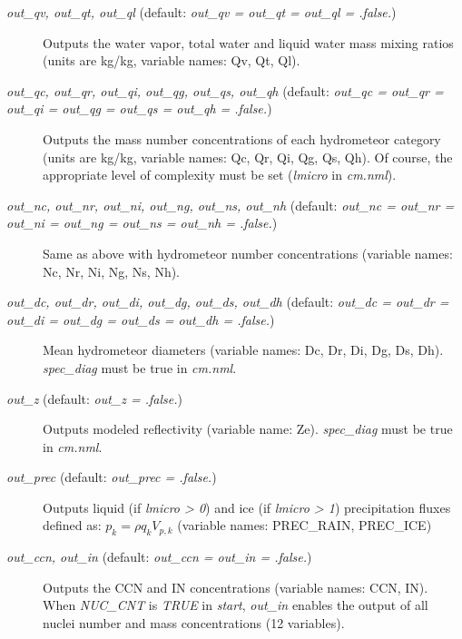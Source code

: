 \documentclass[12pt,A4,french]{article}
\begin{document}
\begin{description}
\item[{\it out\_qv, out\_qt, out\_ql} (default: {\it out\_qv = out\_qt = out\_ql = .false.})]

Outputs the water vapor, total water and liquid water mass mixing ratios (units are kg/kg, variable names: Qv, Qt, Ql).

\item[{\it out\_qc, out\_qr, out\_qi, out\_qg, out\_qs, out\_qh} (default: {\it out\_qc = out\_qr = out\_qi = out\_qg = out\_qs = out\_qh = .false.})]

Outputs the mass number concentrations of each hydrometeor category (units are kg/kg, variable names: Qc, Qr, Qi, Qg, Qs, Qh). Of course, the appropriate level of complexity must be set ({\it lmicro} in {\it cm.nml}).

\item[{\it out\_nc, out\_nr, out\_ni, out\_ng, out\_ns, out\_nh} (default: {\it out\_nc = out\_nr = out\_ni = out\_ng = out\_ns = out\_nh = .false.})]

Same as above with hydrometeor number concentrations (variable names: Nc, Nr, Ni, Ng, Ns, Nh).

\item[{\it out\_dc, out\_dr, out\_di, out\_dg, out\_ds, out\_dh} (default: {\it out\_dc = out\_dr = out\_di = out\_dg = out\_ds = out\_dh = .false.})]

Mean hydrometeor diameters (variable names: Dc, Dr, Di, Dg, Ds, Dh). {\it spec\_diag} must be true in {\it cm.nml}.

\item[{\it out\_z} (default: {\it out\_z = .false.})]

Outputs modeled reflectivity (variable name: Ze). {\it spec\_diag} must be true in {\it cm.nml}.

\item[{\it out\_prec} (default: {\it out\_prec = .false.})]

Outputs liquid (if {\it lmicro > 0}) and ice (if {\it lmicro > 1}) precipitation fluxes defined as: $p_k = \rho q_k V_{p,k}$ (variable names: PREC\_RAIN, PREC\_ICE)

\item[{\it out\_ccn, out\_in} (default: {\it out\_ccn = out\_in = .false.})]

Outputs the CCN and IN concentrations (variable names: CCN, IN). When {\it NUC\_CNT} is {\it TRUE} in {\it start}, {\it out\_in} enables the output of all nuclei number and mass concentrations (12 variables).


\end{description}
\end{document}
